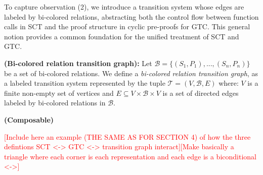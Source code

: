 \documentclass{article}
\begin{document}
To capture observation (2), we introduce a transition system whose edges are labeled by bi-colored relations, abstracting both the control flow between function calls in SCT and the proof structure in cyclic pre-proofs for GTC. This general notion provides a common foundation for the unified treatment of SCT and GTC.

\begin{definition}
    \textbf{(Bi-colored relation transition graph):} Let $\mathcal{B} = \{(S_1,P_1),...,(S_n,P_n) \}$ be a set of bi-colored relations. We define a \emph{bi-colored relation transition graph}, as a labeled transition system represented by the tuple $\mathcal{T} =(V, \mathcal{B}, E)$ where: $V$ is a finite non-empty set of vertices and $E \subseteq V \times \mathcal{B}\times V$ is a set of directed edges labeled by bi-colored relations in $\mathcal{B}$.   
\end{definition}

\begin{definition}
    \textbf{(Composable)}
\end{definition}

\begin{example}
    \textcolor{red}{[Include here an example (THE SAME AS FOR SECTION 4) of how the three defintions SCT <-> GTC <-> transition graph interact][Make basically a triangle where each corner is each representation and each edge is a biconditional <->]}
\end{example}




\end{document}
